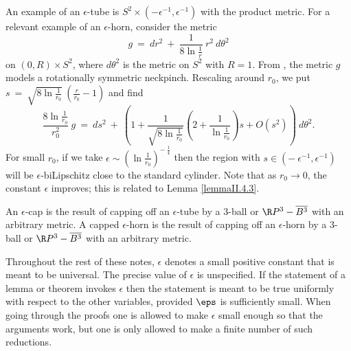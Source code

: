 An example of an $\epsilon$-tube is $S^2 \times (- \epsilon^{-1}, \epsilon^{-1})$ with the
product metric.
For a relevant example of an $\epsilon$-horn, consider the metric
\begin{equation}
g \: = \: dr^2 \: + \: \frac{1}{8\ln \frac{1}{r}} \: r^2 \: d\theta^2
\end{equation}
on $(0, R) \times S^2$, where $d\theta^2$ is the metric on $S^2$ with $R=1$.
From \cite{Angenent-Knopf}, the metric $g$ models a rotationally symmetric
neckpinch. Rescaling around $r_0$, we put
$s \: = \: \sqrt{8 \ln \frac{1}{r_0}} \: \left( \frac{r}{r_0} - 1 \right)$ and find
\begin{equation}
\frac{8 \ln \frac{1}{r_0} }{r_0^2} \: g \: = \:
ds^2 \: + \: \left( 1 +
{ \frac{1}{\sqrt{8 \ln \frac{1}{r_0} }}  }
\left( 2 +
\frac{1}{\ln \frac{1}{r_0}}
\right) s + O(s^2) \right) \: d\theta^2.
\end{equation}
For small $r_0$, if we take
$\epsilon \sim \left( \ln \frac{1}{r_0} \right)^{- \: \frac14}$ then the region with
$s \in \left( - \: \epsilon^{-1}, \epsilon^{-1} \right)$
will be $\epsilon$-biLipschitz close
to the standard cylinder. Note that as $r_0 \rightarrow 0$,
the constant $\epsilon$ improves; this is related to
Lemma \ref{lemmaII.4.3}.


An $\epsilon$-cap is the result of capping off an $\epsilon$-tube by a
$3$-ball or $\R P^3 - \overline{B^3}$
with an arbitrary metric.  A capped $\epsilon$-horn
is the result of capping off an $\epsilon$-horn by a
$3$-ball or $\R P^3 - \overline{B^3}$ with an arbitrary metric.

\begin{remark}
  \label{rem:kl-notation-terminology-positivity-notation-terminology}

\label{remepsilon}
Throughout the rest of these notes, $\epsilon$ denotes a small
positive constant that is meant to be universal.  The precise value
of $\epsilon$ is unspecified.  If the statement of a lemma or
theorem invokes $\epsilon$ then the statement is meant to be true
uniformly with respect to the other variables, provided $\eps$ is
sufficiently small. When going through
the proofs one is allowed to make $\epsilon$ small enough
so that the arguments work, but one is only allowed to make a
finite number of such reductions.
\end{remark}

